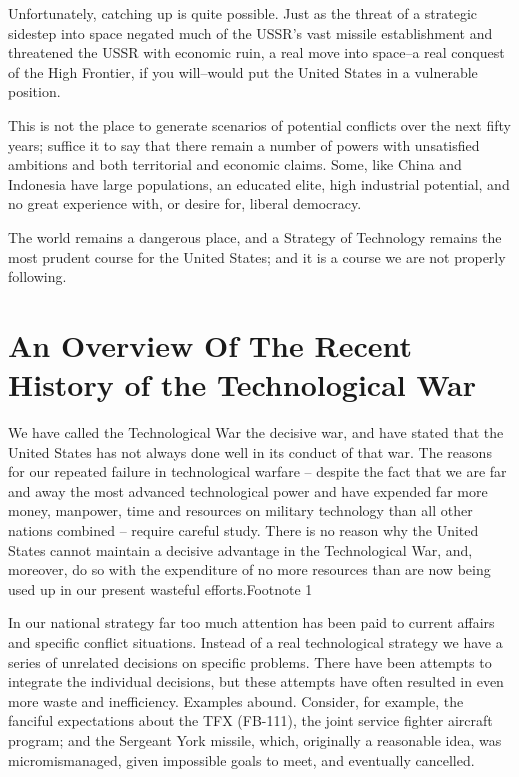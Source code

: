 \documentclass[a4paper,12pt]{book}
\begin{document}
Unfortunately, catching up is quite possible. Just as the threat of a strategic sidestep into space negated much of the USSR's vast missile establishment and threatened the USSR with economic ruin, a real move into space--a real conquest of the High Frontier, if you will--would put the United States in a vulnerable position.

This is not the place to generate scenarios of potential conflicts over the next fifty years; suffice it to say that there remain a number of powers with unsatisfied ambitions and both territorial and economic claims. Some, like China and Indonesia have large populations, an educated elite, high industrial potential, and no great experience with, or desire for, liberal democracy.

The world remains a dangerous place, and a Strategy of Technology remains the most prudent course for the United States; and it is a course we are not properly following.


\chapter{An Overview Of The Recent History of the Technological War}

We have called the Technological War the decisive war, and have stated that the United States has not always done well in its conduct of that war. The reasons for our repeated failure in technological warfare -- despite the fact that we are far and away the most advanced technological power and have expended far more money, manpower, time and resources on military technology than all other nations combined -- require careful study. There is no reason why the United States cannot maintain a decisive advantage in the Technological War, and, moreover, do so with the expenditure of no more resources than are now being used up in our present wasteful efforts.Footnote 1

In our national strategy far too much attention has been paid to current affairs and specific conflict situations. Instead of a real technological strategy we have a series of unrelated decisions on specific problems. There have been attempts to integrate the individual decisions, but these attempts have often resulted in even more waste and inefficiency. Examples abound. Consider, for example, the fanciful expectations about the TFX (FB-111), the joint service fighter aircraft program; and the Sergeant York missile, which, originally a reasonable idea, was micromismanaged, given impossible goals to meet, and eventually cancelled.
\end{document}
